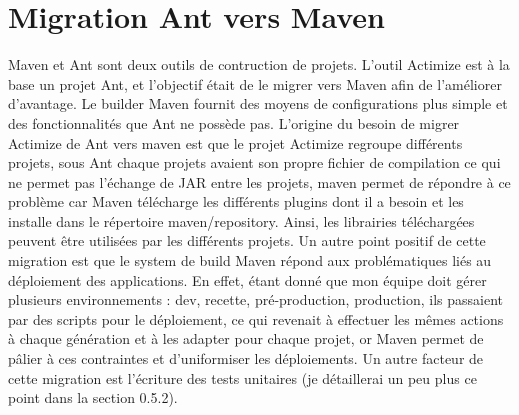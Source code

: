 \documentclass[12pt,a4paper]{report}
\begin{document}
\newpage
\section{\textbf{Migration Ant vers Maven}}
Maven et Ant sont deux outils de contruction de projets. L'outil Actimize est à la base un projet Ant, et l'objectif était de le migrer vers Maven afin de l'améliorer d'avantage. Le builder Maven fournit des moyens de configurations plus simple et des fonctionnalités que Ant ne possède pas.
\newline
L'origine du besoin de migrer Actimize de Ant vers maven est que le projet Actimize regroupe différents projets, sous Ant chaque projets avaient son propre fichier de compilation ce qui ne permet pas l'échange de JAR entre les projets, maven permet de répondre à ce problème car Maven télécharge les différents plugins dont il a besoin et les installe dans le répertoire maven/repository. Ainsi, les librairies téléchargées peuvent être utilisées par les différents projets.
\vspace{0.3cm}\newline
Un autre point positif de cette migration est que le system de build Maven répond aux problématiques liés au déploiement des applications. En effet, étant donné que mon équipe doit gérer plusieurs environnements : dev, recette, pré-production, production, ils passaient par des scripts pour le déploiement, ce qui revenait à effectuer les mêmes actions à chaque génération et à les adapter pour chaque projet, or Maven permet de pâlier à ces contraintes et d'uniformiser les déploiements.
\newline Un autre facteur de cette migration est l'écriture des tests unitaires (je détaillerai un peu plus ce point dans la section 0.5.2).
\end{document}

